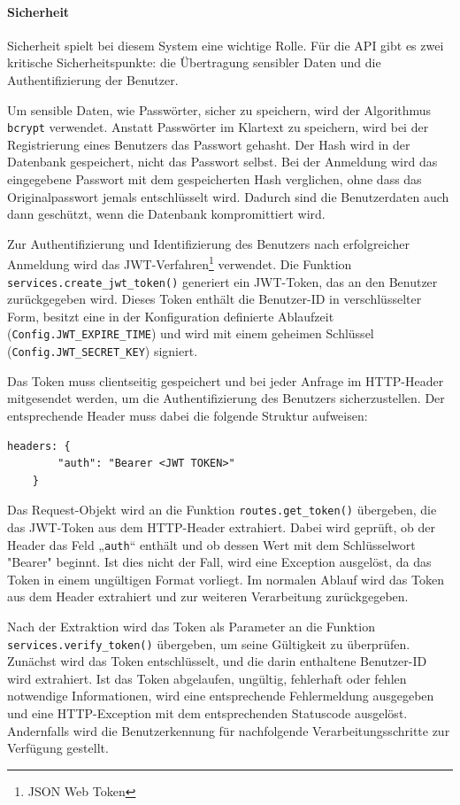 \documentclass[12pt, letterpaper]{article}
\begin{document}
  \paragraph{Sicherheit}
  \par \textbf{}
  \par Sicherheit spielt bei diesem System eine wichtige Rolle. Für die API gibt es zwei kritische Sicherheitspunkte: die Übertragung sensibler Daten und die Authentifizierung der Benutzer.
  \par Um sensible Daten, wie Passwörter, sicher zu speichern, wird der Algorithmus \texttt{bcrypt} verwendet. Anstatt Passwörter im Klartext zu speichern, wird bei der Registrierung eines Benutzers das Passwort gehasht. Der Hash wird in der Datenbank gespeichert, nicht das Passwort selbst. Bei der Anmeldung wird das eingegebene Passwort mit dem gespeicherten Hash verglichen, ohne dass das Originalpasswort jemals entschlüsselt wird. Dadurch sind die Benutzerdaten auch dann geschützt, wenn die Datenbank kompromittiert wird.
  \par Zur Authentifizierung und Identifizierung des Benutzers nach erfolgreicher Anmeldung wird das JWT-Verfahren\footnote {JSON Web Token} verwendet. Die Funktion \texttt{services.create\_jwt\_token()} generiert ein JWT-Token, das an den Benutzer zurückgegeben wird. Dieses Token enthält die Benutzer-ID in verschlüsselter Form, besitzt eine in der Konfiguration definierte Ablaufzeit (\texttt{Config.JWT\_EXPIRE\_TIME}) und wird mit einem geheimen Schlüssel (\texttt{Config.JWT\_SECRET\_KEY}) signiert.
  \par Das Token muss clientseitig gespeichert und bei jeder Anfrage im HTTP-Header mitgesendet werden, um die Authentifizierung des Benutzers sicherzustellen. Der entsprechende Header muss dabei die folgende Struktur aufweisen:
  \begin{Verbatim}[frame=single]
    headers: {
        "auth": "Bearer <JWT TOKEN>"
    }
  \end{Verbatim}
  \par Das Request-Objekt wird an die Funktion \texttt{routes.get\_token()} übergeben, die das JWT-Token aus dem HTTP-Header extrahiert. Dabei wird geprüft, ob der Header das Feld „\texttt{auth}“ enthält und ob dessen Wert mit dem Schlüsselwort "Bearer" beginnt. Ist dies nicht der Fall, wird eine Exception ausgelöst, da das Token in einem ungültigen Format vorliegt. Im normalen Ablauf wird das Token aus dem Header extrahiert und zur weiteren Verarbeitung zurückgegeben.
  \par Nach der Extraktion wird das Token als Parameter an die Funktion \texttt{services.verify\_token()} übergeben, um seine Gültigkeit zu überprüfen. Zunächst wird das Token entschlüsselt, und die darin enthaltene Benutzer-ID wird extrahiert.  Ist das Token abgelaufen, ungültig, fehlerhaft oder fehlen notwendige Informationen, wird eine entsprechende Fehlermeldung ausgegeben und eine HTTP-Exception mit dem entsprechenden Statuscode ausgelöst. Andernfalls wird die Benutzerkennung für nachfolgende Verarbeitungsschritte zur Verfügung gestellt.
\end{document}
